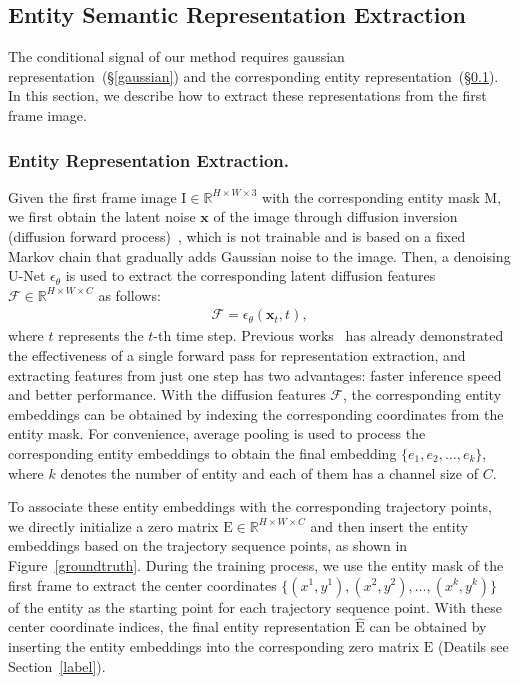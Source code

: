 \documentclass[runningheads]{llncs}
\begin{document}
\subsection{Entity Semantic Representation Extraction}
\label{Entity}
%
The conditional signal of our method requires  gaussian representation~(\S\ref{gaussian}) and the corresponding entity representation~(\S\ref{Entity}).
%
In this section, we describe how to extract these representations from the first frame image.
%


\subsubsection{Entity Representation Extraction.}
\label{Entity1}
Given the first frame image $\bm{\mathrm{I}} \in \mathbb{R}^{H\times W \times 3}$ with the corresponding entity mask $\bm{\mathrm{M}}$,
%
we first obtain the latent noise $\bm{x}$ of the image through diffusion inversion (diffusion forward process)~\cite{ho2020denoising,wu2024datasetdm,tang2024emergent}, which is not trainable and is based on a fixed Markov chain that gradually adds Gaussian noise to the image.
%
Then, a denoising U-Net $\epsilon_{\theta}$ is used to extract the corresponding latent diffusion features $\mathcal{F} \in \mathbb{R}^{H\times W \times C}$ as follows: 
\begin{align}
  \mathcal{F} = \epsilon_{\theta}(\bm{x}_t, t),
\end{align}
where $t$ represents the $t$-th time step. 
%
Previous works~\cite{tang2024emergent,gu2023videoswap,wu2024datasetdm} has already demonstrated the effectiveness of a single forward pass for representation extraction, and extracting features from just one step has two advantages: faster inference speed and better performance.
%
With the diffusion features $\mathcal{F}$, the corresponding entity embeddings can be obtained by indexing the corresponding coordinates from the entity mask.
%
For convenience, average pooling is used to process the corresponding entity embeddings to obtain the final embedding $\{e_1, e_2, ..., e_k\}$, where $k$ denotes the number of entity and each of them has a channel size of $C$.
%

To associate these entity embeddings with the corresponding trajectory points, we directly initialize a zero matrix $\bm{\mathrm{E}} \in \mathbb{R}^{H\times W \times C}$ and then insert the entity embeddings based on the trajectory sequence points, as shown in Figure~\ref{groundtruth}.
%
During the training process, we use the entity mask of the first frame to extract the center coordinates $\{(x^1,y^1), (x^2,y^2), ..., (x^k,y^k)\}$ of the entity as the starting point for each trajectory sequence point.
%
With these center coordinate indices, the final entity representation $\bm{\mathrm{\hat{E}}}$ can be obtained by inserting the entity embeddings into the corresponding zero matrix $\bm{\mathrm{E}}$ (Deatils see Section~\ref{label}).
\end{document}
